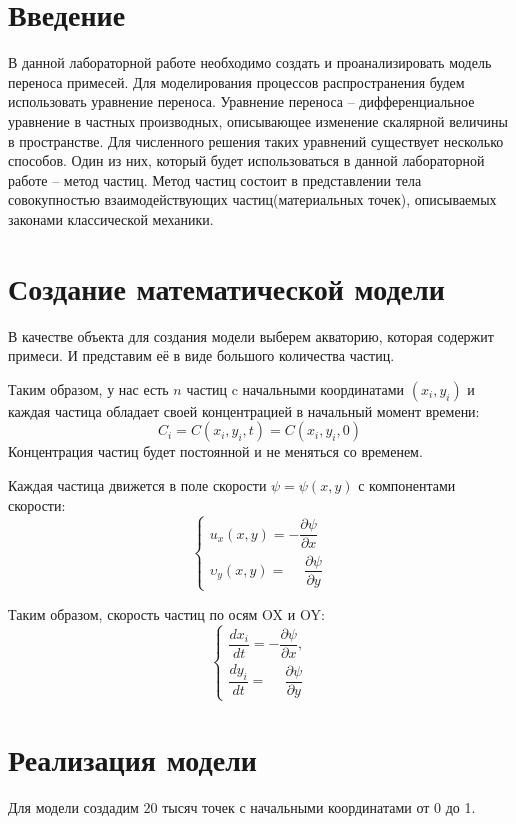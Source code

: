 \documentclass[a4paper, 14pt]{extarticle}
\begin{document}
	\pagebreak	

	\section{Введение}
		В данной лабораторной работе необходимо создать и проанализировать модель переноса примесей. Для моделирования процессов распространения будем использовать уравнение переноса. Уравнение переноса -- дифференциальное уравнение в частных производных, описывающее изменение скалярной величины в пространстве. Для численного решения таких уравнений существует несколько способов. Один из них, который будет использоваться в данной лабораторной работе -- метод частиц. Метод частиц состоит в представлении тела совокупностью взаимодействующих частиц(материальных точек), описываемых законами классической механики.
		
	\section{Создание математической модели}
		В качестве объекта для создания модели выберем акваторию, которая содержит примеси. И представим её в виде большого количества частиц.
		
		Таким образом, у нас есть $n$ частиц c начальными координатами $(x_i, y_i)$ и каждая частица обладает своей концентрацией в начальный момент времени:
		\[ C_i = C(x_i, y_i, t) = C(x_i, y_i, 0)\]
		Концентрация частиц будет постоянной и не меняться со временем.
		
		Каждая частица движется в поле скорости $\psi = \psi(x, y)$ с компонентами скорости:
		\[ \begin{cases}
			u_x (x, y) = -\dfrac{\partial \psi}{\partial x} \\[7pt]
			\upsilon_y (x, y) = \phantom{-} \dfrac{\partial \psi}{\partial y}
		\end{cases} \]
		
		Таким образом, скорость частиц по осям OX и OY:
		\[ \begin{cases}
				\dfrac{dx_i}{dt} = -\dfrac{\partial \psi}{\partial x}, \\[7pt]
				\dfrac{dy_i}{dt} = \phantom{-}\dfrac{\partial \psi}{\partial y}
			\end{cases}
		\]

	\section{Реализация модели}
		Для модели создадим $20$ тысяч точек с начальными координатами от 0 до 1.
		
\end{document}
